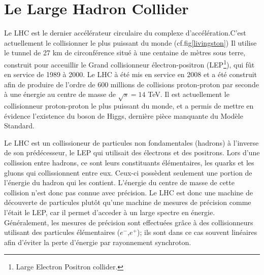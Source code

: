 \section{Le Large Hadron Collider}
Le LHC est le dernier accélérateur circulaire du complexe d'accélération.C'est actuellement le collisionner le plus puissant du monde (cf.fig\ref{livingston}) Il utilise le tunnel de 27 km de circonférence situé à une centaine de mètres sous terre, construit pour acceuillir le Grand collisionneur électron-positron (LEP\footnote{Large Electron Positron collider.}), qui fût en service de 1989 à 2000. Le LHC à été mis en service en 2008 et a été construit afin de produire de l'ordre de 600 millions de collisions proton-proton par seconde à une énergie au centre de masse de $\sqrt{s}=14$ TeV. Il est actuellement le collisionneur proton-proton le plus puissant du monde, et a permis de mettre en évidence l'existence du boson de Higgs, dernière pièce manquante du Modèle Standard.

Le LHC est un collissioneur de particules non fondamentales (hadrons) à l'inverse de son prédécesseur, le LEP qui utilisait des électrons et des positrons. Lors d'une collission entre hadrons, ce sont leurs constituants élémentaires, les quarks et les gluons qui collissionnent entre eux. Ceux-ci possèdent seulement une portion de l'énergie du hadron qui les contient. L'énergie du centre de masse de cette collision n'est donc pas connue avec précision. Le LHC est donc une machine de découverte de particules plutôt qu'une machine de mesures de précision comme l'était le LEP, car il permet d'acceder à un large spectre en énergie. Généralement, les mesures de précision sont effectuées grâce à des collisionneurs utilisant des particules élémentaires ($e^{-}$,$e^{+}$); ils sont dans ce cas souvent linéaires afin d'éviter la perte d'énergie par rayonnement synchroton.

